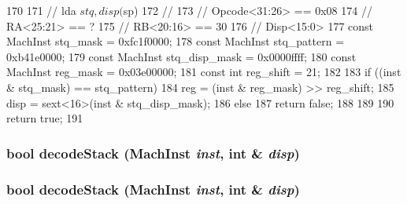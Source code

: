 \begin{DoxyCode}
170 {
171     // lda $stq, disp($sp)
172     //
173     // Opcode<31:26> == 0x08
174     // RA<25:21> == ?
175     // RB<20:16> == 30
176     // Disp<15:0>
177     const MachInst stq_mask = 0xfc1f0000;
178     const MachInst stq_pattern = 0xb41e0000;
179     const MachInst stq_disp_mask = 0x0000ffff;
180     const MachInst reg_mask = 0x03e00000;
181     const int reg_shift = 21;
182 
183     if ((inst & stq_mask) == stq_pattern) {
184         reg = (inst & reg_mask) >> reg_shift;
185         disp = sext<16>(inst & stq_disp_mask);
186     } else {
187         return false;
188     }
189 
190     return true;
191 }
\end{DoxyCode}
\hypertarget{classMipsISA_1_1StackTrace_a61ba7618f77dc6e62d7b0baf6273130c}{
\subsubsection[{decodeStack}]{\setlength{\rightskip}{0pt plus 5cm}bool decodeStack ({\bf MachInst} {\em inst}, \/  int \& {\em disp})}}
\label{classMipsISA_1_1StackTrace_a61ba7618f77dc6e62d7b0baf6273130c}
\hypertarget{classMipsISA_1_1StackTrace_a61ba7618f77dc6e62d7b0baf6273130c}{
\subsubsection[{decodeStack}]{\setlength{\rightskip}{0pt plus 5cm}bool decodeStack ({\bf MachInst} {\em inst}, \/  int \& {\em disp})}}
\label{classMipsISA_1_1StackTrace_a61ba7618f77dc6e62d7b0baf6273130c}



